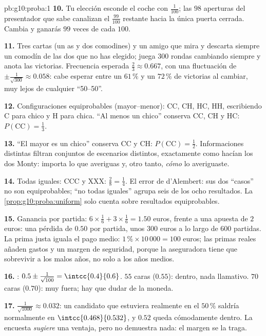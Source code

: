 \begin{solution}{pb:g10:proba:1}
\textbf{10.} Tu elección esconde el coche con 
$\frac{1}{100}$; las $98$ aperturas del presentador que sabe canalizan el
$\frac{99}{100}$ restante hacia la única puerta cerrada. Cambia y ganarás
$99$ veces de cada $100$.

\textbf{11.} Tres cartas (un as y dos comodines) y un amigo que mira y
descarta siempre un comodín de las dos que no has elegido; juega $300$
rondas cambiando siempre y anota las victorias. Frecuencia esperada
$\frac23 \approx 0.667$, con una fluctuación de
$\pm\frac{1}{\sqrt{300}} \approx 0.058$: cabe esperar entre un $61\,\%$ y
un $72\,\%$ de victorias al cambiar, muy lejos de cualquier ``50--50''.

\textbf{12.} Configuraciones equiprobables (mayor--menor): CC, CH, HC,
HH, escribiendo C para chico y H para chica. ``Al menos un chico''
conserva CC, CH y HC: $P(\text{CC}) = \frac13$.

\textbf{13.} ``El mayor es un chico'' conserva CC y CH:
$P(\text{CC}) = \frac12$. Informaciones distintas filtran conjuntos de
escenarios distintos, exactamente como hacían los dos Monty: importa lo
que averiguas y, otro tanto, \emph{cómo} lo averiguaste.

\textbf{14.} Todas iguales: CCC y XXX: $\frac28 = \frac14$. El error de
d'Alembert: sus dos ``casos'' no son equiprobables; ``no todas iguales''
agrupa seis de los ocho resultados. La
\cref{prop:g10:proba:uniform} solo cuenta sobre resultados
equiprobables.

\textbf{15.} Ganancia  por partida: $6 \times \frac16 + 3
\times \frac16 = 1.50$ euros, frente a una apuesta de $2$ euros: una
pérdida  de $0.50$ por partida, unos $300$ euros a lo largo de $600$
partidas. La prima justa iguala el pago medio:
$1\,\% \times 10\,000 = 100$ euros; las primas reales añaden gastos y un
margen de seguridad, porque la aseguradora tiene que sobrevivir a los
malos años, no solo a los años medios.

\textbf{16.} : $0.5 \pm \frac{1}{\sqrt{100}} =
\intcc{0.4}{0.6}$. $55$ caras ($0.55$): dentro, nada llamativo. $70$
caras ($0.70$): muy fuera; hay que dudar de la moneda.

\textbf{17.} $\frac{1}{\sqrt{1000}} \approx 0.032$: un candidato que
estuviera realmente en el $50\,\%$ saldría normalmente en
$\intcc{0.468}{0.532}$, y $0.52$ queda cómodamente dentro. La encuesta
\emph{sugiere} una ventaja, pero no demuestra nada: el margen se la traga.


\end{solution}
